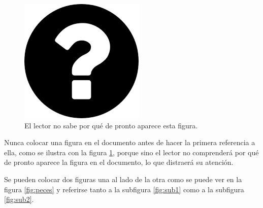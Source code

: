 \begin{figure}[h]
	\centering
	\includegraphics[scale=.4]{./Figures/questionMark.png}
	\caption{El lector no sabe por qué de pronto aparece esta figura.}
	\label{fig:questionMark}
\end{figure}

Nunca colocar una figura en el documento antes de hacer la primera referencia a ella, como se ilustra con la figura \ref{fig:questionMark}, porque sino el lector no comprenderá por qué de pronto aparece la figura en el documento, lo que distraerá su atención.

Se pueden colocar dos figuras una al lado de la otra como se puede ver en la figura \ref{fig:peces} y referirse tanto a la subfigura \ref{fig:sub1} como a la subfigura \ref{fig:sub2}.


